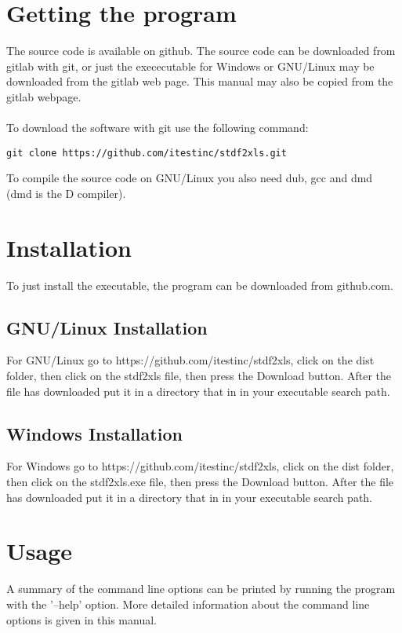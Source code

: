 \documentclass[letterpaper]{article}
\begin{document}
\section{Getting the program}

The source code is available on github. The source code can be downloaded
from gitlab with git, or just the exececutable for Windows or GNU/Linux
may be downloaded from the gitlab web page.  This manual may also be copied
from the gitlab webpage.\\
\\
To download the software with git use the following command:
\begin{verbatim}
git clone https://github.com/itestinc/stdf2xls.git
\end{verbatim}

To compile the source code on GNU/Linux you also need dub, gcc and dmd (dmd is the D compiler).

\section{Installation}

To just install the executable, the program can be downloaded from github.com.

\subsection{GNU/Linux Installation}

For GNU/Linux go to https://github.com/itestinc/stdf2xls, click on the dist folder, then
click on the stdf2xls file, then press the Download button.  After the file has downloaded
put it in a directory that in in your executable search path.

\subsection{Windows Installation}

For Windows go to https://github.com/itestinc/stdf2xls, click on the dist folder, then 
click on the stdf2xls.exe file, then press the Download button.  After the file has downloaded
put it in a directory that in in your executable search path.

\section{Usage}

A summary of the command line options can be printed by running the program
with the '--help' option.  More detailed information about the command line
options is given in this manual.
\end{document}
